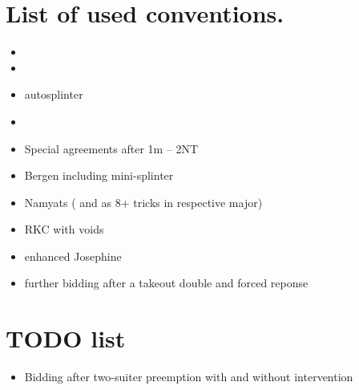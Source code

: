 \documentclass{article}
\begin{document}
  \section{List of used conventions.}
  \begin{itemize}
    \item 
    \item 
    \item autosplinter
    \item 
    \item Special agreements after 1m -- 2NT
    \item Bergen including mini-splinter
    \item Namyats ( and  as 8+ tricks in respective major)
    \item RKC with voids
    \item enhanced Josephine 
    \item further bidding after a takeout double and forced reponse
  \end{itemize}

  \section{TODO list}
  \begin{itemize}
    \item Bidding after two-suiter preemption with and without intervention
  \end{itemize}
\end{document}
